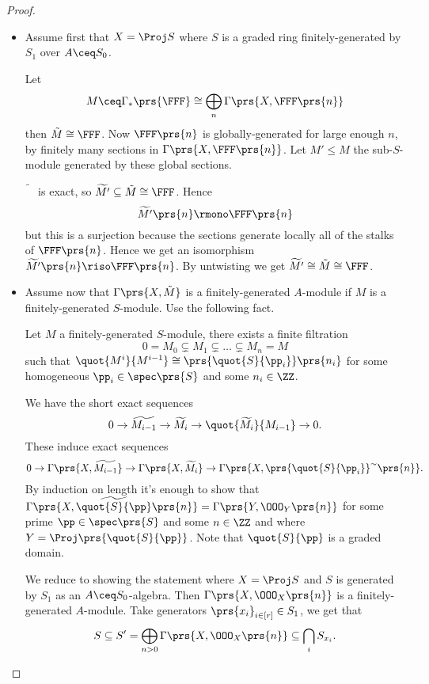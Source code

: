 \documentclass[10pt,a4paper,twoside,openany,hidelinks]{book}
\begin{document}
\begin{proof}
\begin{itemize}
\item Assume first that $X = \Proj S$ where $S$ is a graded ring finitely-generated by $S_1$ over $A \ceq S_0$.

Let \[M \ceq \Gamma_*\prs{\FFF} \cong \bigoplus_{n} \Gamma\prs{X, \FFF\prs{n}}\]
then $\tilde{M} \cong \FFF$.
Now $\FFF\prs{n}$ is globally-generated for large enough $n$, by finitely many sections in $\Gamma\prs{X, \FFF\prs{n}}$.
Let $M' \leq M$ the sub-$S$-module generated by these global sections.

$\tilde{\phantom{H}}$ is exact, so $\widetilde{M'} \subseteq \tilde{M} \cong \FFF$. Hence
\[\widetilde{M'} \prs{n} \rmono \FFF\prs{n}\]
but this is a surjection because the sections generate locally all of the stalks of $\FFF\prs{n}$.
Hence we get an isomorphism $\widetilde{M'}\prs{n} \riso \FFF\prs{n}$. By untwisting we get $\widetilde{M'} \cong \tilde{M} \cong \FFF$.

\item Assume now that $\Gamma\prs{X, \tilde{M}}$ is a finitely-generated $A$-module if $M$ is a finitely-generated $S$-module. Use the following fact.

\begin{fact}
Let $M$ a finitely-generated $S$-module, there exists a finite filtration
\[0 = M_0 \subsetneq M_1 \subsetneq \ldots \subsetneq M_n = M\]
such that
$\quot{M^i}{M^{i-1}} \cong \prs{\quot{S}{\pp_i}}\prs{n_i}$ for some homogeneous $\pp_i \in \spec\prs{S}$ and some $n_i \in \ZZ$.
\end{fact}

We have the short exact sequences
\[0 \to \widetilde{M_{i-1}} \to \widetilde{M_i} \to \quot{\widetilde{M_i}}{M_{i-1}} \to 0 \text{.}\]
These induce exact sequences
\[0 \to \Gamma\prs{X, \widetilde{M_{i-1}}} \to \Gamma\prs{X, \widetilde{M_i}} \to \Gamma\prs{X, \prs{\quot{S}{\pp_i}}^\sim\prs{n}} \text{.}\]
By induction on length it's enough to show that $\Gamma\prs{X, \widetilde{\quot{S}{\pp}}\prs{n}} = \Gamma\prs{Y, \OOO_Y\prs{n}}$ for some prime $\pp \in \spec\prs{S}$ and some $n \in \ZZ$ and where $Y = \Proj\prs{\quot{S}{\pp}}$. Note that $\quot{S}{\pp}$ is a graded domain.

We reduce to showing the statement where $X = \Proj S$ and $S$ is generated by $S_1$ as an $A \ceq S_0$-algebra.
Then
$\Gamma\prs{X, \OOO_X\prs{n}}$ is a finitely-generated $A$-module. Take generators $\prs{x_i}_{i \in [r]} \in S_1$, we get that
\[S \subseteq S' = \bigoplus_{n > 0} \Gamma\prs{X, \OOO_X\prs{n}} \subseteq \bigcap_{i} S_{x_i} \text{.}\]


\end{itemize}
\end{proof}
\end{document}
